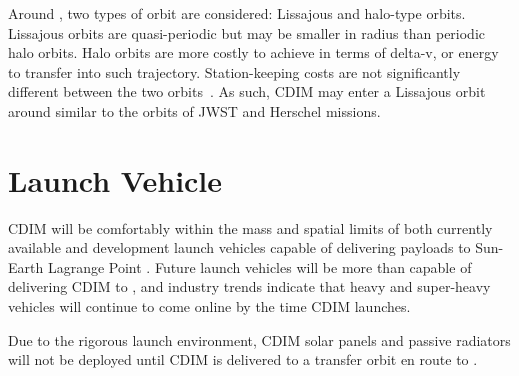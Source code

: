 \documentclass{ws-jai}
\begin{document}
Around \Ltwo, two types of orbit are considered: Lissajous and halo-type orbits.
Lissajous orbits are quasi-periodic but may be smaller in radius than periodic halo orbits.
Halo orbits are more costly to achieve in terms of delta-v, or energy to transfer into such trajectory.
Station-keeping costs are not significantly different between the two orbits~\cite{gordon1993orbit}.
As such, CDIM may enter a Lissajous orbit around \Ltwo{} similar to the orbits of JWST and Herschel missions.

\section{Launch Vehicle}
\label{sec:launch}
CDIM will be comfortably within the mass and spatial limits of both currently available and development launch vehicles capable of delivering payloads to Sun-Earth Lagrange Point \Ltwo.
Future launch vehicles will be more than capable of delivering CDIM to \Ltwo, and industry trends indicate that heavy and super-heavy vehicles will continue to come online by the time CDIM launches.

Due to the rigorous launch environment, CDIM solar panels and passive radiators will not be deployed until CDIM is delivered to a transfer orbit en route to \Ltwo.
\end{document}
